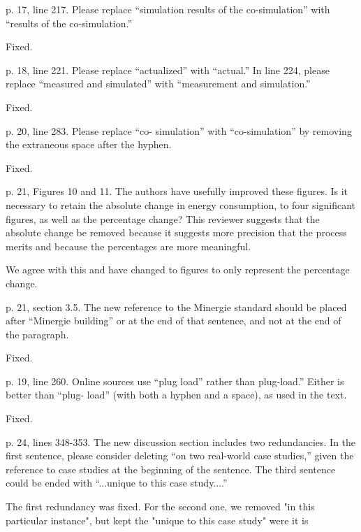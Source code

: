 \documentclass[answers,12pt]{exam}
\begin{document}
\begin{questions}
\question p. 17, line 217. Please replace “simulation results of the co-simulation” with “results of
the co-simulation.”
\begin{solution}
Fixed.
\end{solution}

\question p. 18, line 221. Please replace “actualized” with “actual.” In line 224, please replace
“measured and simulated” with “measurement and simulation.”
\begin{solution}
Fixed.
\end{solution}

\question p. 20, line 283. Please replace “co- simulation” with “co-simulation” by removing the
extraneous space after the hyphen.
\begin{solution}
Fixed.
\end{solution}

\question p. 21, Figures 10 and 11. The authors have usefully improved these figures. Is it
necessary to retain the absolute change in energy consumption, to four significant figures, as well as the percentage change? This reviewer suggests that the absolute change be removed because it suggests more precision that the process merits and because the percentages are more meaningful.
\begin{solution}
We agree with this and have changed to figures to only represent the percentage change.
\end{solution}

\question p. 21, section 3.5. The new reference to the Minergie standard should be placed after “Minergie building” or at the end of that sentence, and not at the end of the paragraph.
\begin{solution}
Fixed.
\end{solution}

\question p. 19, line 260. Online sources use “plug load” rather than plug-load.” Either is better than “plug- load” (with both a hyphen and a space), as used in the text.
\begin{solution}
Fixed.
\end{solution}

\question  p. 24, lines 348-353. The new discussion section includes two redundancies. In the first sentence, please consider deleting “on two real-world case studies,” given the reference to case studies at the beginning of the sentence. The third sentence could be ended with “...unique to this case study....”
\begin{solution}
The first redundancy was fixed. For the second one, we removed "in this particular instance", but kept the "unique to this case study" were it is
\end{solution}


\end{questions}
\end{document}
